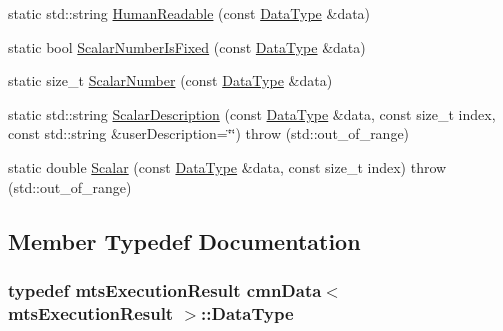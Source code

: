 \begin{DoxyCompactItemize}
\item 
static std\-::string \hyperlink{classcmn_data_3_01mts_execution_result_01_4_a18792f83a83729ebe0ee369e42c179dc}{Human\-Readable} (const \hyperlink{classcmn_data_3_01mts_execution_result_01_4_ac2ad50be3b07e7b046435ae0ed516b18}{Data\-Type} \&data)
\item 
static bool \hyperlink{classcmn_data_3_01mts_execution_result_01_4_a0f0946923fe1c3f668d9a48316c038b7}{Scalar\-Number\-Is\-Fixed} (const \hyperlink{classcmn_data_3_01mts_execution_result_01_4_ac2ad50be3b07e7b046435ae0ed516b18}{Data\-Type} \&data)
\item 
static size\-\_\-t \hyperlink{classcmn_data_3_01mts_execution_result_01_4_af7b1e7ea8aa59ebecd4e29d357a757ab}{Scalar\-Number} (const \hyperlink{classcmn_data_3_01mts_execution_result_01_4_ac2ad50be3b07e7b046435ae0ed516b18}{Data\-Type} \&data)
\item 
static std\-::string \hyperlink{classcmn_data_3_01mts_execution_result_01_4_a0f4e88c5b061067bdea342ede82669a1}{Scalar\-Description} (const \hyperlink{classcmn_data_3_01mts_execution_result_01_4_ac2ad50be3b07e7b046435ae0ed516b18}{Data\-Type} \&data, const size\-\_\-t index, const std\-::string \&user\-Description=\char`\"{}\char`\"{})  throw (std\-::out\-\_\-of\-\_\-range)
\item 
static double \hyperlink{classcmn_data_3_01mts_execution_result_01_4_a956663b56c396d27059bfa6cc8f70c21}{Scalar} (const \hyperlink{classcmn_data_3_01mts_execution_result_01_4_ac2ad50be3b07e7b046435ae0ed516b18}{Data\-Type} \&data, const size\-\_\-t index)  throw (std\-::out\-\_\-of\-\_\-range)
\end{DoxyCompactItemize}


\subsection{Member Typedef Documentation}
\hypertarget{classcmn_data_3_01mts_execution_result_01_4_ac2ad50be3b07e7b046435ae0ed516b18}{
\subsubsection[{Data\-Type}]{\setlength{\rightskip}{0pt plus 5cm}typedef {\bf mts\-Execution\-Result} {\bf cmn\-Data}$<$ {\bf mts\-Execution\-Result} $>$\-::{\bf Data\-Type}}}\label{classcmn_data_3_01mts_execution_result_01_4_ac2ad50be3b07e7b046435ae0ed516b18}


